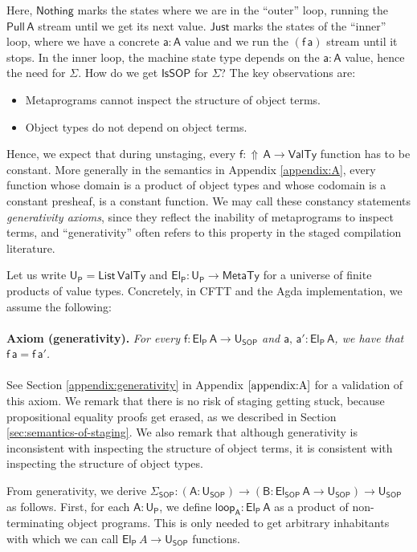 \documentclass[acmsmall,screen]{acmart}
\newcommand{\msf}[1]{{\mathsf{#1}}}
\newcommand{\vA}{\mathsf{A}}
\newcommand{\vB}{\mathsf{B}}
\newcommand{\va}{\mathsf{a}}
\newcommand{\vf}{\mathsf{f}}
\newcommand{\SOP}{\msf{SOP}}
\newcommand{\El}{\msf{El}}
\newcommand{\USOP}{\msf{U}_{\msf{SOP}}}
\newcommand{\Uprod}{\msf{U_P}}
\newcommand{\Elprod}{\msf{El_{P}}}
\newcommand{\IsSOP}{\msf{IsSOP}}
\newcommand{\List}{\msf{List}}
\newcommand{\Lift}{{\Uparrow}}
\newcommand{\MTy}{\msf{MetaTy}}
\newcommand{\VTy}{\msf{ValTy}}
\newcommand{\Nothing}{\msf{Nothing}}
\newcommand{\Just}{\msf{Just}}
\theoremstyle{remark}
\newcommand{\Pull}{\msf{Pull}}
\begin{document}
Here, $\Nothing$ marks the states where we are in the ``outer'' loop, running
the $\Pull\,\vA$ stream until we get its next value. $\Just$ marks the states of
the ``inner'' loop, where we have a concrete $\va : \vA$ value and we run the
$(\vf\,\va)$ stream until it stops. In the inner loop, the machine state type
depends on the $\va : \vA$ value, hence the need for $\Sigma$. How do we get
$\IsSOP$ for $\Sigma$? The key observations are:
\begin{itemize}
 \item Metaprograms cannot inspect the structure of object terms.
 \item Object types do not depend on object terms.
\end{itemize}
Hence, we expect that during unstaging, every $\vf : \Lift\,\vA \to \VTy$
function has to be constant. More generally in the semantics in Appendix \ref{appendix:A}, every function whose domain is a product
of object types and whose codomain is a constant presheaf, is a constant
function. We may call these constancy statements \emph{generativity axioms},
since they reflect the inability of metaprograms to inspect terms, and
``generativity'' often refers to this property in the staged compilation
literature.

Let us write $\Uprod = \List\,\VTy$ and $\Elprod : \Uprod \to \MTy$ for a
universe of finite products of value types. Concretely, in CFTT and the Agda
implementation, we assume the following:
\\\\
\noindent \textbf{Axiom (generativity).}\textit{ For every $\vf : \Elprod\,\vA \to \USOP$ and $\va,\,\va' : \Elprod\,\vA$,
we have that $\vf\,\va = \vf\,\va'$.}
\\\\
See Section \ref{appendix:generativity} in Appendix $\ref{appendix:A}$ for a
validation of this axiom. We remark that there is no risk of staging getting
stuck, because propositional equality proofs get erased, as we described in
Section \ref{sec:semantics-of-staging}. We also remark that although
generativity is inconsistent with inspecting the structure of object terms, it
is consistent with inspecting the structure of object types.

From generativity, we derive $\Sigma_\SOP : (\vA : \USOP) \to (\vB : \El_\SOP\,\vA \to \USOP)
\to \USOP$ as follows. First, for each $\vA : \Uprod$, we define $\msf{loop_{\vA}} :
\Elprod\,\vA$ as a product of non-terminating object programs. This is only needed
to get arbitrary inhabitants with which we can call $\Elprod\,A \to \USOP$
functions.
\end{document}
